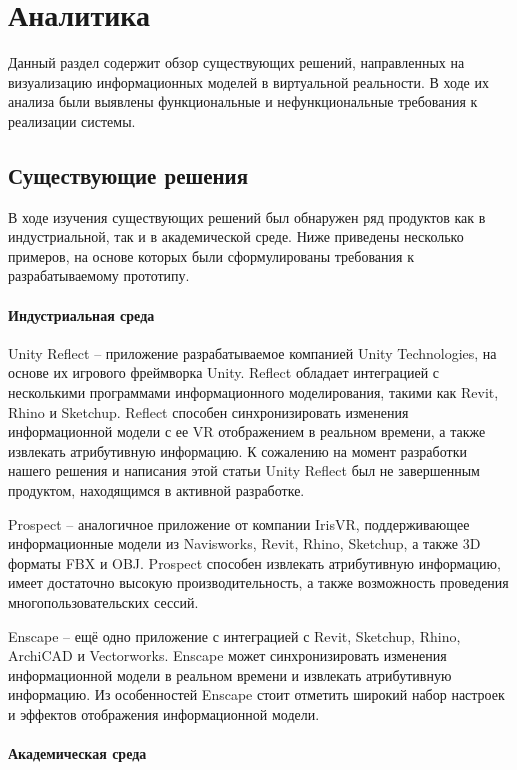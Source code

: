 ﻿\section{Аналитика}

Данный раздел содержит обзор существующих решений,
направленных на визуализацию информационных моделей в виртуальной реальности.
В ходе их анализа были выявлены функциональные и нефункциональные требования
к реализации системы. 

\subsection{Существующие решения}
В ходе изучения существующих решений был обнаружен ряд продуктов
как в индустриальной, так и в академической среде.
Ниже приведены несколько примеров,
на основе которых были сформулированы требования к разрабатываемому прототипу.

\paragraph{Индустриальная среда}

Unity Reflect -- приложение разрабатываемое компанией Unity Technologies,
на основе их игрового фреймворка Unity.
\cite{UnityReflect}
Reflect обладает интеграцией с несколькими программами информационного моделирования,
такими как Revit, Rhino и Sketchup.
Reflect способен синхронизировать изменения информационной модели с
ее VR отображением в реальном времени, а также извлекать атрибутивную информацию.
К сожалению на момент разработки нашего решения и написания этой статьи
Unity Reflect был не завершенным продуктом, находящимся в активной разработке.

Prospect -- аналогичное приложение от компании IrisVR,
поддерживающее информационные модели
из Navisworks, Revit, Rhino, Sketchup, а также 3D форматы FBX и OBJ.
\cite{IrisVR}
Prospect способен извлекать атрибутивную информацию,
имеет достаточно высокую производительность,
а также возможность проведения многопользовательских сессий.

Enscape -- ещё одно приложение с интеграцией
с Revit, Sketchup, Rhino, ArchiCAD и Vectorworks.
\cite{Enscape}
Enscape может синхронизировать изменения информационной модели в реальном времени
и извлекать атрибутивную информацию.
Из особенностей Enscape стоит отметить широкий набор
настроек и эффектов отображения информационной модели.

\paragraph{Академическая среда}

